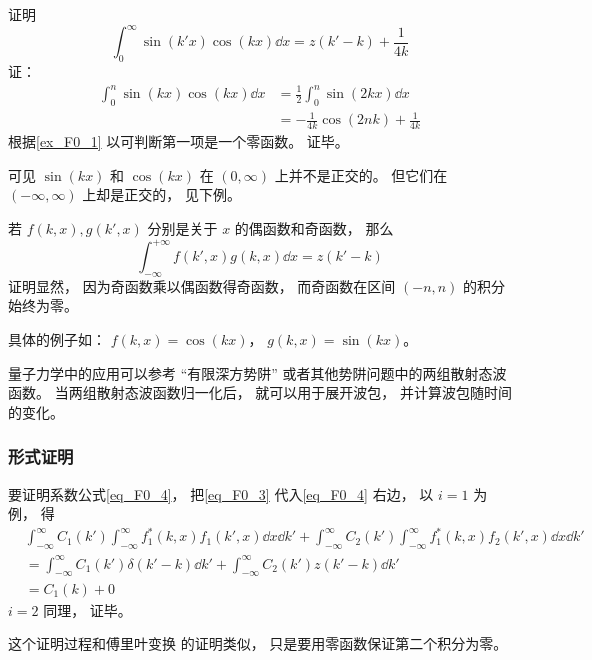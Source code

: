 \begin{example}{}
证明
\begin{equation}
\int_0^\infty \sin(k'x)\cos(kx) \dd{x} = z(k' - k) + \frac{1}{4k}
\end{equation}
证：
\begin{equation}
\begin{aligned}
\int_0^n \sin(kx)\cos(kx) \dd{x} &= \frac{1}{2} \int_0^n \sin(2kx) \dd{x}\\
&= -\frac{1}{4k}\cos(2nk) + \frac{1}{4k}
\end{aligned}
\end{equation}
根据\autoref{ex_F0_1} 以可判断第一项是一个零函数。 证毕。

可见 $\sin(kx)$ 和 $\cos(kx)$ 在 $(0,\infty)$ 上并不是正交的。 但它们在 $(-\infty, \infty)$ 上却是正交的， 见下例。
\end{example}

\begin{example}{}\label{ex_F0_2}
若 $f(k,x),g(k',x)$ 分别是关于 $x$ 的偶函数和奇函数， 那么
\begin{equation}
\int_{-\infty}^{+\infty} f(k', x) g(k, x) \dd{x} = z(k'-k)
\end{equation}
证明显然， 因为奇函数乘以偶函数得奇函数， 而奇函数在区间 $(-n, n)$ 的积分始终为零。

具体的例子如： $f(k,x) = \cos(kx)$， $g(k, x) = \sin(kx)$。
\end{example}

量子力学中的应用可以参考 “有限深方势阱” 或者其他势阱问题中的两组散射态波函数。 当两组散射态波函数归一化后， 就可以用于展开波包， 并计算波包随时间的变化。

\subsubsection{形式证明}
要证明系数公式\autoref{eq_F0_4}， 把\autoref{eq_F0_3} 代入\autoref{eq_F0_4} 右边， 以 $i = 1$ 为例， 得
\begin{equation}
\begin{aligned}
&\int_{-\infty}^{\infty} C_1(k') \int_{-\infty}^{\infty} f_1^*(k, x) f_1(k', x)\dd{x} \dd{k'} + \int_{-\infty}^{\infty} C_2(k') \int_{-\infty}^{\infty} f_1^*(k, x)f_2(k', x)\dd{x} \dd{k'}\\
&= \int_{-\infty}^{\infty} C_1(k') \delta(k' - k) \dd{k'} + \int_{-\infty}^{\infty} C_2(k') z(k' - k) \dd{k'}\\
&= C_1(k) + 0
\end{aligned}
\end{equation}
$i = 2$ 同理， 证毕。

这个证明过程和傅里叶变换 的证明类似， 只是要用零函数保证第二个积分为零。
